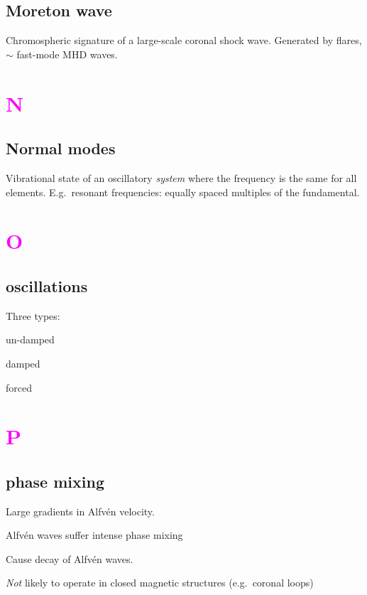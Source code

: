 \documentclass[12pt]{article}
\begin{document}
\subsection*{Moreton wave}
Chromospheric signature of a large-scale coronal shock wave. Generated
by flares, $\sim$ fast-mode MHD waves.

\section*{\textcolor{magenta}{N}}
\subsection*{Normal modes}
Vibrational state of an oscillatory \emph{system} where the frequency
is the same for all elements. E.g.\ resonant frequencies: equally
spaced multiples of the fundamental.

\section*{\textcolor{magenta}{O}}
\subsection*{oscillations}
Three types:
\begin{enumerate*}
    \item un-damped
    \item damped
    \item forced
\end{enumerate*}

\section*{\textcolor{magenta}{P}}

\subsection*{phase mixing}
\begin{itemize*}
    \item Large gradients in Alfv\'en velocity.
    \item Alfv\'en waves suffer intense phase mixing
    \item Cause decay of Alfv\'en waves.
    \item \emph{Not} likely to operate in closed magnetic structures
        (e.g.\ coronal loops)
\end{itemize*}
\end{document}
